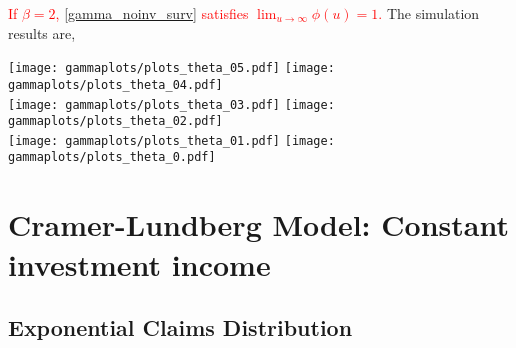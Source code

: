 \documentclass[12pt]{article}
\begin{document}
    \textcolor{red}{If \(\beta=2\), \eqref{gamma_noinv_surv} satisfies $\displaystyle\lim_{u\to \infty}\phi(u)=1$.}
    The simulation results are,
    \begin{flushleft}
        \texttt{[image: gammaplots/plots\_theta\_05.pdf]}
        \texttt{[image: gammaplots/plots\_theta\_04.pdf]}\\
        \texttt{[image: gammaplots/plots\_theta\_03.pdf]}
        \texttt{[image: gammaplots/plots\_theta\_02.pdf]}\\
        \texttt{[image: gammaplots/plots\_theta\_01.pdf]}
        \texttt{[image: gammaplots/plots\_theta\_0.pdf]}\\
    \end{flushleft}
\vspace{1 cm}

\newpage
\section{Cramer-Lundberg Model: Constant investment income}

\subsection{Exponential Claims Distribution}
\end{document}
